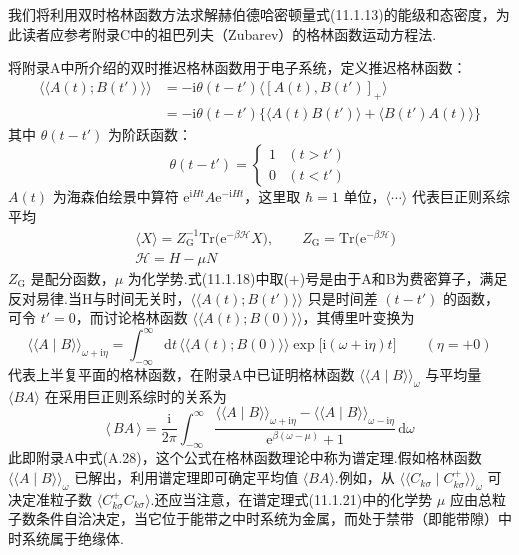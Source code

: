 我们将利用双时格林函数方法求解赫伯德哈密顿量式(11.1.13)的能级和态密度，为此读者应参考附录C中的祖巴列夫（Zubarev）的格林函数运动方程法.

将附录A中所介绍的双时推迟格林函数用于电子系统，定义推迟格林函数：
\begin{equation}
\begin{aligned}
  \langle\langle A(t);B(t')\rangle\rangle
  &=-\mathrm{i}\theta(t-t')\langle[A(t),B(t')]_{+}\rangle\\
  &=-\mathrm{i}\theta(t-t')\bigl\{\langle A(t)B(t')\rangle
  +\langle B(t')A(t)\rangle\bigr\}
\end{aligned}
\end{equation}
其中 $\theta(t-t')$ 为阶跃函数：
\begin{equation*}
  \theta(t-t')=\begin{cases}1&(t>t')\\0&(t<t')\end{cases}
\end{equation*}
$A(t)$ 为海森伯绘景中算符 $\mathrm{e}^{\mathrm{i}Ht}A\mathrm{e}^{-\mathrm{i}Ht}$，这里取 $\hbar=1$ 单位，$\langle\cdots\rangle$ 代表巨正则系综平均
\begin{equation}
\begin{aligned}
  &\langle X\rangle=Z^{-1}_{\mathrm{G}}\mathrm{Tr}
  \bigl(\mathrm{e}^{-\beta\mathscr{H}}X\bigr),
  \qquad Z_{\mathrm{G}}=\mathrm{Tr}\bigl(\mathrm{e}^{-\beta\mathscr{H}}\bigr)\\
  &\mathscr{H}=H-\mu N
\end{aligned}
\end{equation}
$Z_{\mathrm{G}}$ 是配分函数，$\mu$ 为化学势.式(11.1.18)中取(+)号是由于A和B为费密算子，满足反对易律.当H与时间无关时，$\langle\langle A(t);B(t')\rangle\rangle$ 只是时间差 $(t-t')$ 的函数，可令 $t'=0$，而讨论格林函数 $\langle\langle A(t);B(0)\rangle\rangle$，其傅里叶变换为
\begin{equation}
  \langle\langle A\mid B\rangle\rangle_{\omega+\mathrm{i}\eta}
  =\int_{-\infty}^{\infty}\mathrm{d}t\,
  \langle\langle A(t);B(0)\rangle\rangle
  \exp\bigl[\mathrm{i}(\omega+\mathrm{i}\eta)t\bigr]
  \qquad(\eta=+0)
\end{equation}
代表上半复平面的格林函数，在附录A中已证明格林函数 $\langle\langle A\mid B\rangle\rangle_{\omega}$ 与平均量 $\langle BA\rangle$ 在采用巨正则系综时的关系为
\begin{equation}
  \langle\,BA\,\rangle=\frac{\mathrm{i}}{2\pi}
  \int_{-\infty}^{\infty}
  \frac{\langle\langle A\mid B\rangle\rangle_{\omega+\mathrm{i}\eta}
  -\langle\langle A\mid B\rangle\rangle_{\omega-\mathrm{i}\eta}}
  {\mathrm{e}^{\beta(\omega-\mu)}+1}\,\mathrm{d}\omega
\end{equation}
此即附录A中式(A.28)，这个公式在格林函数理论中称为谱定理.假如格林函数 $\langle\langle A\mid B\rangle\rangle_{\omega}$ 已解出，利用谱定理即可确定平均值 $\langle BA\rangle$.例如，从 $\langle\langle C_{k\sigma}\mid C^{+}_{k\sigma}\rangle\rangle_{\omega}$ 可决定准粒子数 $\langle C^{+}_{k\sigma}C_{k\sigma}\rangle$.还应当注意，在谱定理式(11.1.21)中的化学势 $\mu$ 应由总粒子数条件自洽决定，当它位于能带之中时系统为金属，而处于禁带（即能带隙）中时系统属于绝缘体.

